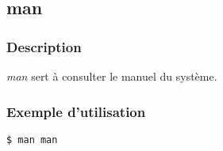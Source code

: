 \subsection*{man}
\subsubsection*{Description}
\emph{man} sert à consulter le manuel du système. 

\subsubsection*{Exemple d'utilisation}

\begin{lstlisting}
$ man man
\end{lstlisting}
